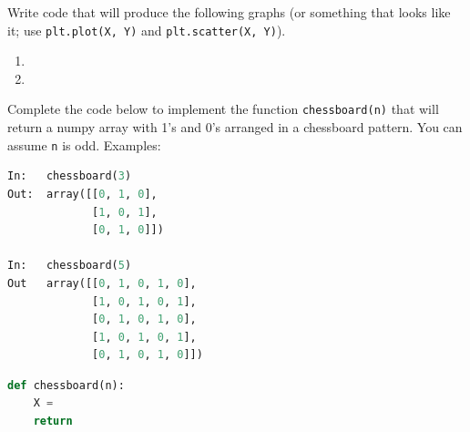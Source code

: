 \documentclass[addpoints,12pt]{exam}
\newcommand{\code}[1]{{\texttt{#1}}}
\begin{document}
\begin{questions}
\newpage
\question[20] Write code that will produce the following graphs (or something that looks like it; use \code{plt.plot(X, Y)} and \code{plt.scatter(X, Y)}).
\begin{enumerate}
\item
{}
\vfill
\item 
{}
\vfill
\end{enumerate}


\newpage
\question[20] Complete the code below to implement the function \code{chessboard(n)} that will return a numpy array with 1's and 0's arranged in a chessboard pattern. You can assume \code{n} is odd. 
Examples:
\begin{lstlisting}[language=python]
In:   chessboard(3)
Out:  array([[0, 1, 0],
             [1, 0, 1],
             [0, 1, 0]])

In:   chessboard(5)
Out   array([[0, 1, 0, 1, 0],
             [1, 0, 1, 0, 1],
             [0, 1, 0, 1, 0],
             [1, 0, 1, 0, 1],
             [0, 1, 0, 1, 0]])
\end{lstlisting}

\begin{lstlisting}[language=python]
def chessboard(n):
    X = 
    return 
\end{lstlisting}


\end{questions}
\end{document}
